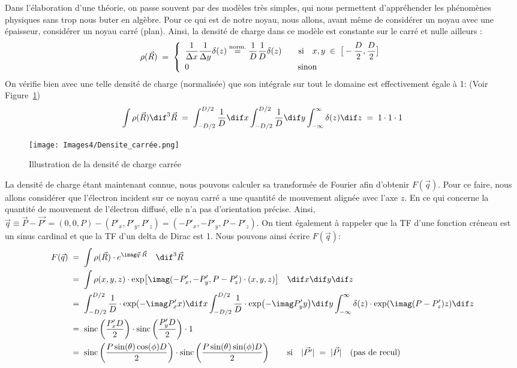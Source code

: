 Dans l'élaboration d'une théorie, on passe souvent par des modèles très simples, qui nous permettent d'appréhender les phénomènes physiques sans trop nous buter en algèbre. Pour ce qui est de notre noyau, nous allons, avant même de considérer un noyau avec une épaisseur, considérer un noyau carré (plan). Ainsi, la densité de charge dans ce modèle est constante sur le carré et nulle ailleurs :
\[
    \rho(\vec{R}) \; = \;
    \left\{
    \begin{array}{ll}
        \dfrac{1}{\Delta x} \dfrac{1}{\Delta y} \delta(z)
        \overset{\text{norm.}}= 
        \dfrac{1}{D}\dfrac{1}{D}\delta(z)
        \qquad \text{si} \quad
        x,y \;\in\; \big[ -\dfrac{D}{2},\dfrac{D}{2} \big]
    \\[7pt]
        0 \qquad \qquad \qquad \qquad \qquad \qquad \quad \text{sinon}
    \end{array}
    \right.
\]
On vérifie bien avec une telle densité de charge (normalisée) que son intégrale sur tout le domaine est effectivement égale à 1: (Voir Figure~\ref{fig:densite_carree})
\[
    \int \rho(\vec{R}) \dif^3\vec{R}
    \eq
    \int_{-D/2}^{D/2}\dfrac{1}{D} \dif x
    \int_{-D/2}^{D/2}\dfrac{1}{D} \dif y
    \int_{-\infty}^{\infty}\delta (z)\dif z
    \eq 1\cdot 1 \cdot 1
\]
\begin{figure}[H]
    \centering
    \texttt{[image: Images4/Densite\_carrée.png]}
    \caption{Illustration de la densité de charge carrée}
    \label{fig:densite_carree}
\end{figure}
La densité de charge étant maintenant connue, nous pouvons calculer sa transformée de Fourier afin d'obtenir $F(\vec{q})$. Pour ce faire, nous allons considérer que l'électron incident sur ce noyau carré a une quantité de mouvement alignée avec l'axe $z$. En ce qui concerne la quantité de mouvement de l'électron diffusé, elle n'a pas d'orientation précise. Ainsi, $\vec{q} \equiv \vec{P}-\vec{P'} = (0,0,P)-(P'_x,P'_y,P'_z) = (-P'_x,-P'_y,P-P'_z) $. On tient également à rappeler que la TF d'une fonction créneau est un sinus cardinal et que la TF d'un delta de Dirac est 1.
Nous pouvons ainsi écrire $F(\vec{q})$:
\begin{align*}
    F(\vec{q}) 
    &\eq
    \int \rho(\vec{R}) \cdot e^{\imag\vec{q} \cdot\vec{R}} \quad \dif^3\vec{R}\\
    &\eq
    \int \rho(x,y,z) \cdot \exp[\imag(-P'_x,-P'_y,P-P'_z) \cdot(x,y,z)] \quad \dif x\dif y\dif z\\
    &\eq
    \int_{-D/2}^{D/2}\dfrac{1}{D}     \cdot \exp(-\imag P'_xx) \dif x
    \int_{-D/2}^{D/2}\dfrac{1}{D}     \cdot \exp(-\imag P'_yy) \dif y
    \int_{-\infty}^{\infty} \delta(z) \cdot \exp(\imag (P-P'_z)z) \dif z\\
    &\eq
    \sinc\left(\dfrac{P'_xD}{2}\right) \cdot
    \sinc\left(\dfrac{P'_yD}{2}\right) \cdot 1\\
    &\eq
    \sinc\left(\dfrac{P \sin(\theta)\cos(\phi)D}{2}\right) \cdot
    \sinc\left(\dfrac{P \sin(\theta)\sin(\phi)D}{2}\right)
    \qquad \text{si} \quad |\vec{P'}|\eq|\vec{P}| \quad \text{(pas de recul)}
\end{align*}
